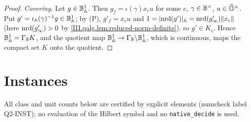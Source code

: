\begin{proof}
\emph{Covering.} Let $g\in\mathbb{B}_{\mathbb{A}}^1$. Then $g_f=\iota(\gamma)x_cu$ for some $c$, $\gamma\in\mathbb{B}^\times$, $u\in\widehat{\mathbb{O}}^\times$. Put $g'=\iota_{\mathbb{A}}(\gamma)^{-1}g\in\mathbb{B}_{\mathbb{A}}^1$; by (P),
$g'_f=x_cu$ and $1=\lvert\operatorname{nrd}(g')\rvert_{\mathbb{A}}=\operatorname{nrd}(g'_\infty)\lVert x_c\rVert$ (here $\operatorname{nrd}(g'_\infty)>0$ by \cref{III.qalg.lem:reduced-norm-definite}), so $g'\in K_c$. Hence
$\mathbb{B}_{\mathbb{A}}^1=\Gamma_{\mathbb{B}}K$, and the quotient map $\mathbb{B}_{\mathbb{A}}^1\to\Gamma_{\mathbb{B}}\backslash\mathbb{B}_{\mathbb{A}}^1$, which is continuous, maps the compact set $K$ onto the quotient.
\end{proof}

\section{Instances}\label{sec:qcls-instances}

\noindent All class and unit counts below are certified by explicit elements (numcheck label Q2-INST); no evaluation of the Hilbert symbol and
no \texttt{native\_decide} is used.


